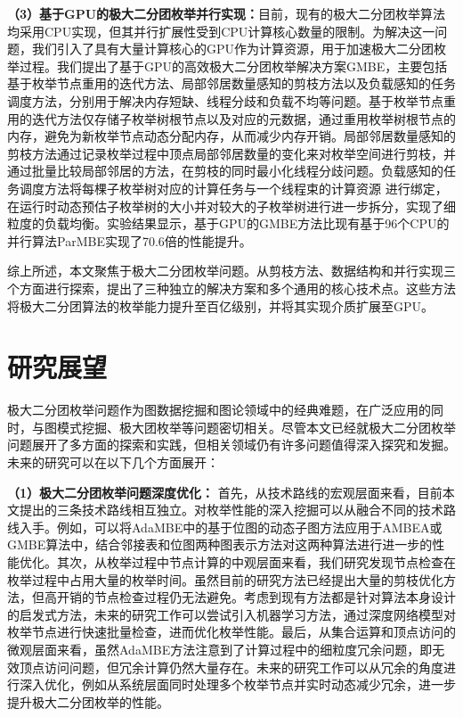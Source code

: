 \textbf{（3）基于GPU的极大二分团枚举并行实现：}目前，现有的极大二分团枚举算法均采用CPU实现，但其并行扩展性受到CPU计算核心数量的限制。为解决这一问题，我们引入了具有大量计算核心的GPU作为计算资源，用于加速极大二分团枚举过程。我们提出了基于GPU的高效极大二分团枚举解决方案GMBE，主要包括基于枚举节点重用的迭代方法、局部邻居数量感知的剪枝方法以及负载感知的任务调度方法，分别用于解决内存短缺、线程分歧和负载不均等问题。基于枚举节点重用的迭代方法仅存储子枚举树根节点以及对应的元数据，通过重用枚举树根节点的内存，避免为新枚举节点动态分配内存，从而减少内存开销。局部邻居数量感知的剪枝方法通过记录枚举过程中顶点局部邻居数量的变化来对枚举空间进行剪枝，并通过批量比较局部邻居的方法，在剪枝的同时最小化线程分歧问题。负载感知的任务调度方法将每棵子枚举树对应的计算任务与一个线程束的计算资源 
进行绑定，在运行时动态预估子枚举树的大小并对较大的子枚举树进行进一步拆分，实现了细粒度的负载均衡。实验结果显示，基于GPU的GMBE方法比现有基于96个CPU的并行算法ParMBE实现了70.6倍的性能提升。

综上所述，本文聚焦于极大二分团枚举问题。从剪枝方法、数据结构和并行实现三个方面进行探索，提出了三种独立的解决方案和多个通用的核心技术点。这些方法将极大二分团算法的枚举能力提升至百亿级别，并将其实现介质扩展至GPU。

\section{研究展望}

极大二分团枚举问题作为图数据挖掘和图论领域中的经典难题，在广泛应用的同时，与图模式挖掘、极大团枚举等问题密切相关。尽管本文已经就极大二分团枚举问题展开了多方面的探索和实践，但相关领域仍有许多问题值得深入探究和发掘。未来的研究可以在以下几个方面展开：

\textbf{（1）极大二分团枚举问题深度优化：} 首先，从技术路线的宏观层面来看，目前本文提出的三条技术路线相互独立。对枚举性能的深入挖掘可以从融合不同的技术路线入手。例如，可以将AdaMBE中的基于位图的动态子图方法应用于AMBEA或GMBE算法中，结合邻接表和位图两种图表示方法对这两种算法进行进一步的性能优化。其次，从枚举过程中节点计算的中观层面来看，我们研究发现节点检查在枚举过程中占用大量的枚举时间。虽然目前的研究方法已经提出大量的剪枝优化方法，但高开销的节点检查过程仍无法避免。考虑到现有方法都是针对算法本身设计的启发式方法，未来的研究工作可以尝试引入机器学习方法，通过深度网络模型对枚举节点进行快速批量检查，进而优化枚举性能。最后，从集合运算和顶点访问的微观层面来看，虽然AdaMBE方法注意到了计算过程中的细粒度冗余问题，即无效顶点访问问题，但冗余计算仍然大量存在。未来的研究工作可以从冗余的角度进行深入优化，例如从系统层面同时处理多个枚举节点并实时动态减少冗余，进一步提升极大二分团枚举的性能。

